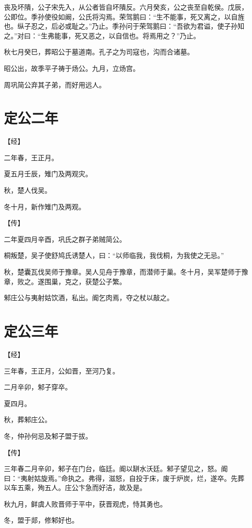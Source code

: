 \documentclass[a4paper,12pt,UTF8,twoside]{ctexbook}
\begin{document}
丧及坏隤，公子宋先入，从公者皆自坏隤反。六月癸亥，公之丧至自乾侯。戊辰，公即位。季孙使役如阚，公氏将沟焉。荣驾鹅曰：“生不能事，死又离之，以自旌也。纵子忍之，后必或耻之。”乃止。季孙问于荣驾鹅曰：“吾欲为君谥，使子孙知之。”对曰：“生弗能事，死又恶之，以自信也。将焉用之？”乃止。

秋七月癸巳，葬昭公于墓道南。孔子之为司寇也，沟而合诸墓。

昭公出，故季平子祷于炀公。九月，立炀宫。

周巩简公弃其子弟，而好用远人。


\section{定公二年}


【经】

二年春，王正月。

夏五月壬辰，雉门及两观灾。

秋，楚人伐吴。

冬十月，新作雉门及两观。

【传】

二年夏四月辛酉，巩氏之群子弟贼简公。

桐叛楚，吴子使舒鸠氏诱楚人，曰：“以师临我，我伐桐，为我使之无忌。”

秋，楚囊瓦伐吴师于豫章。吴人见舟于豫章，而潜师于巢。冬十月，吴军楚师于豫章，败之。遂围巢，克之，获楚公子繁。

邾庄公与夷射姑饮酒，私出。阍乞肉焉，夺之杖以敲之。


\section{定公三年}




【经】

三年春，王正月，公如晋，至河乃复。

二月辛卯，邾子穿卒。

夏四月。

秋，葬邾庄公。

冬，仲孙何忌及邾子盟于拔。

【传】

三年春二月辛卯，邾子在门台，临廷。阍以缾水沃廷。邾子望见之，怒。阍曰：“夷射姑旋焉。”命执之。弗得，滋怒，自投于床，废于炉炭，烂，遂卒。先葬以车五乘，殉五人。庄公卞急而好洁，故及是。

秋九月，鲜虞人败晋师于平中，获晋观虎，恃其勇也。

冬，盟于郯，修邾好也。
\end{document}
